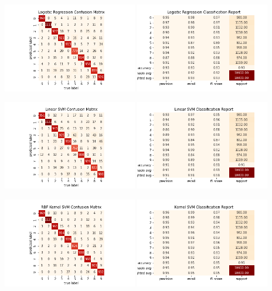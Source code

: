 \documentclass[twoside,10pt]{article}
\begin{document}
\begin{enumerate}
\begin{enumerate}
	\begin{center}
	\includegraphics[width = 0.44\textwidth]{logistic}
	\includegraphics[width = 0.44\textwidth]{logistic_class}
	\end{center}
	
	\begin{center}
	\includegraphics[width = 0.44\textwidth]{linearsvm}
	\includegraphics[width = 0.44\textwidth]{linearsvm_class}
	\end{center}
	
	\begin{center}
	\includegraphics[width = 0.44\textwidth]{kernelsvm}
	\includegraphics[width = 0.44\textwidth]{kernelsvm_class}
	\end{center}
	

\end{enumerate}
\end{enumerate}
\end{document}
